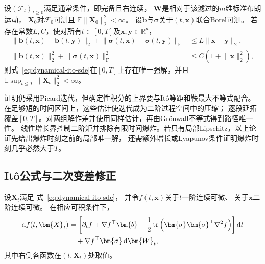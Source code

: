 \begin{theorem}[SDE强解的存在唯一性]
	\label{thm:dynamical-sde-strong-existence}
	设$(\mathcal F_t)_{t\geq0}$满足通常条件，即完备且右连续，
	$\bm W$是相对于该滤过的$m$维标准布朗运动，
	$\bm{X}_0$对$\mathcal{F}_0$可测且
	$\mathbb{E}\lVert\bm{X}_0\rVert_2^2<\infty$。
	设$\bm b$与$\bm\sigma$关于$(t,\bm x)$联合Borel可测。
	若存在常数$L,C$，使对所有$t\in[0,T]$及$\bm{x},\bm{y}\in\mathbb{R}^d$，
	\begin{align*}
		\lVert\bm{b}(t,\bm{x})-\bm{b}(t,\bm{y})\rVert_2
		+\lVert\bm{\sigma}(t,\bm{x})-\bm{\sigma}(t,\bm{y})\rVert_{\mathrm{F}}
		&\leq L\lVert\bm{x}-\bm{y}\rVert_2,\\
		\lVert\bm{b}(t,\bm{x})\rVert_2^2
		+\lVert\bm{\sigma}(t,\bm{x})\rVert_{\mathrm{F}}^2
		&\leq C(1+\lVert\bm{x}\rVert_2^2),
	\end{align*}
	则式~\eqref{eq:dynamical-ito-sde}在$[0,T]$上存在唯一强解，并且
	$\mathbb{E}\sup_{t\leq T}\lVert\bm{X}_t\rVert_2^2<\infty$。
\end{theorem}

证明仍采用Picard迭代，但确定性积分的上界要与Itô等距和鞅最大不等式配合。
在足够短的时间区间上，这些估计使迭代成为二阶过程空间中的压缩；
逐段延拓覆盖$[0,T]$。对两组解作差并使用同样估计，再由Grönwall不等式得到路径唯一性。
线性增长界控制二阶矩并排除有限时间爆炸。若只有局部Lipschitz，以上论证先给出爆炸时刻之前的局部唯一解，
还需额外增长或Lyapunov条件证明爆炸时刻几乎必然大于$T$。

\subsection{Itô公式与二次变差修正}

\begin{theorem}[Itô公式]
	\label{thm:dynamical-ito-formula} 设$\bm{X}_{t}$满足 式~\eqref{eq:dynamical-ito-sde}，
	并令$f(t,\bm{x})$关于$t$一阶连续可微、 关于$\bm{x}$二阶连续可微。 在相应可积条件下，
	\begin{align}
		\mathrm{d}f(t,\bm{X}_{t}) & = \left[ \partial_{t}f + \nabla f^{\top}\bm{b}+ \frac{1}{2}\operatorname{tr}\left( \bm{\sigma}\bm{\sigma}^{\top}\nabla^{2}f \right) \right]\mathrm{d}t \notag \\
		                          & \quad+ \nabla f^{\top}\bm{\sigma}\,\mathrm{d}\bm{W}_{t}, \label{eq:dynamical-ito-formula}
	\end{align}
	其中右侧各函数在$(t,\bm{X}_{t})$处取值。
\end{theorem}

